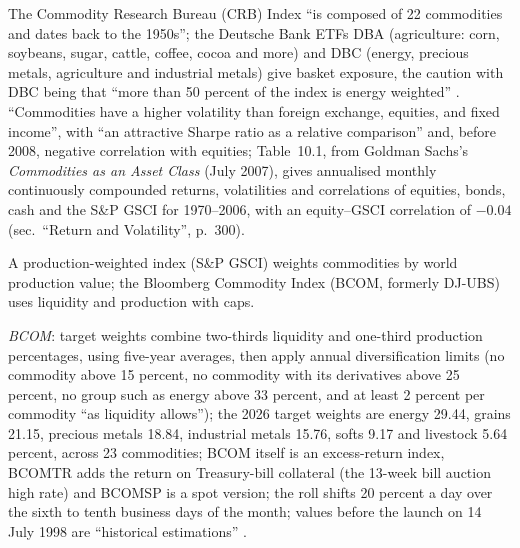 \begin{qfdefinition}\label{def:commodity-indices-risk-return}
 The Commodity Research Bureau (CRB) Index ``is composed of 22 commodities and dates back to the 1950s''; the Deutsche Bank ETFs DBA (agriculture: corn, soybeans, sugar, cattle, coffee, cocoa and more) and DBC (energy, precious metals, agriculture and industrial metals) give basket exposure, the caution with DBC being that ``more than 50 percent of the index is energy weighted'' \citep[chap.~10, sec.\ ``CRB Index'', PDF p.~299]{s7-gliner}. ``Commodities have a higher volatility than foreign exchange, equities, and fixed income'', with ``an attractive Sharpe ratio as a relative comparison'' and, before 2008, negative correlation with equities; Table~10.1, from Goldman Sachs's \emph{Commodities as an Asset Class} (July 2007), gives annualised monthly continuously compounded returns, volatilities and correlations of equities, bonds, cash and the S\&P GSCI for 1970--2006, with an equity--GSCI correlation of $-0.04$ (sec.\ ``Return and Volatility'', p.~300).

 A production-weighted index (S\&P GSCI) weights commodities by world production value; the Bloomberg Commodity Index (BCOM, formerly DJ-UBS) uses liquidity and production with caps.

\emph{BCOM}: target weights combine two-thirds liquidity and one-third production percentages, using five-year averages, then apply annual diversification limits (no commodity above 15 percent, no commodity with its derivatives above 25 percent, no group such as energy above 33 percent, and at least 2 percent per commodity ``as liquidity allows''); the 2026 target weights are energy 29.44, grains 21.15, precious metals 18.84, industrial metals 15.76, softs 9.17 and livestock 5.64 percent, across 23 commodities; BCOM itself is an excess-return index, BCOMTR adds the return on Treasury-bill collateral (the 13-week bill auction high rate) and BCOMSP is a spot version; the roll shifts 20 percent a day over the sixth to tenth business days of the month; values before the launch on 14 July 1998 are ``historical estimations'' \citep[secs.~1.2 with Table~1, 2.2, 2.6, 3.1--3.2 and app.~B, pp.~4--6, 11, 23--25, 31--33 and~40]{bcom-methodology-2026}.


\end{qfdefinition}
